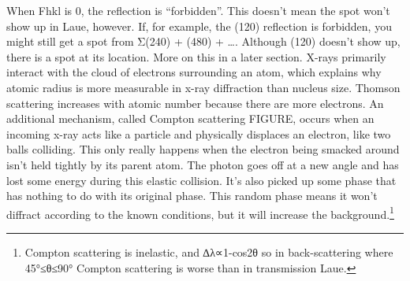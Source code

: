When Fhkl is 0, the reflection is “forbidden”. This doesn’t mean the spot won’t show up in Laue, however. If, for example, the (120) reflection is forbidden, you might still get a spot from  Σ(240) + (480) + …. Although (120) doesn’t show up, there is a spot at its location. More on this in a later section.
X-rays primarily interact with the cloud of electrons surrounding an atom, which explains why atomic radius is more measurable in x-ray diffraction than nucleus size. Thomson scattering increases with atomic number because there are more electrons.
An additional mechanism, called Compton scattering FIGURE, occurs when an incoming x-ray acts like a particle and physically displaces an electron, like two balls colliding. This only really happens when the electron being smacked around isn’t held tightly by its parent atom. The photon goes off at a new angle and has lost some energy during this elastic collision. It’s also picked up some phase that has nothing to do with its original phase. This random phase means it won’t diffract according to the known conditions, but it will increase the background.\footnote{Compton scattering is inelastic, and ∆λ∝1-cos⁡2θ so in back-scattering where 45°≤θ≤90° Compton scattering is worse than in transmission Laue.}

